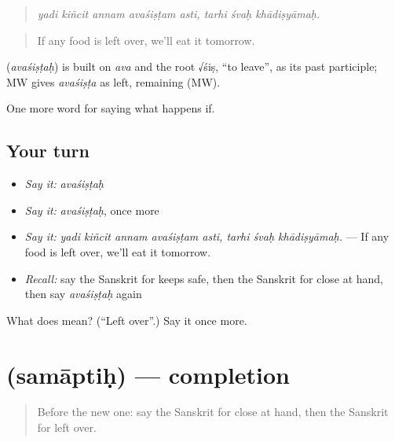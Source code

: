 \begin{quote}
\emph{yadi kiñcit annam avaśiṣṭam asti, tarhi śvaḥ khādiṣyāmaḥ.}
\end{quote}

\begin{quote}
If any food is left over, we'll eat it tomorrow.
\end{quote}

\begin{cousinweb}
\textbf{} (\emph{avaśiṣṭaḥ}) is built on \emph{ava} and the root √śiṣ, \textquotedblleft{}to leave\textquotedblright{}, as its past participle; MW gives \emph{avaśiṣṭa} as left, remaining (MW).
\end{cousinweb}

\begin{grammarlens}[title={What you've built}]
One more word for saying what happens if.
\end{grammarlens}

\subsection*{Your turn}
\begin{itemize}
\raggedright
  \item \emph{Say it:} \emph{avaśiṣṭaḥ}
  \item \emph{Say it:} \emph{avaśiṣṭaḥ}, once more
  \item \emph{Say it:} \emph{yadi kiñcit annam avaśiṣṭam asti, tarhi śvaḥ khādiṣyāmaḥ.} — If any food is left over, we'll eat it tomorrow.
  \item \emph{Recall:} say the Sanskrit for keeps safe, then the Sanskrit for close at hand, then say \emph{avaśiṣṭaḥ} again
\end{itemize}

\begin{tcolorbox}[breakable,colback=teal!4,colframe=teal!35!black,title={Before you move on}]
What does  mean? (\textquotedblleft{}Left over\textquotedblright{}.) Say it once more.
\end{tcolorbox}
\section[\texorpdfstring{\sk{समाप्तिः} (samāptiḥ)}{समाप्तिः (samāptiḥ)}]{ (samāptiḥ) — completion}

\label{lesson:SA-C540-samaptih}



\begin{quote}
Before the new one: say the Sanskrit for close at hand, then the Sanskrit for left over.
\end{quote}

